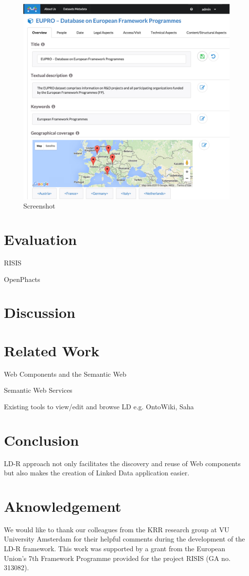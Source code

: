 \documentclass{acm_proc_article-sp}
\begin{document}
\begin{figure}[tb]
  \includegraphics[width=.9\linewidth]{images/screenshot.jpg}
  \caption{Screenshot}
\end{figure}

\section{Evaluation}

RISIS

OpenPhacts

\section{Discussion}

\section{Related Work}

Web Components and the Semantic Web~\cite{pahl2011}

Semantic Web Services

Existing tools to view/edit and browse LD e.g. OntoWiki, Saha

\section{Conclusion}

LD-R approach not only facilitates the discovery and reuse of Web components but also makes the creation of Linked Data application easier.

\section{Aknowledgement}
We would like to thank our colleagues from the KRR research group at VU University Amsterdam for their helpful comments during the development of the LD-R framework. This work was supported by a grant from the European Union’s 7th Framework Programme provided for the project RISIS (GA no. 313082).




\end{document}
